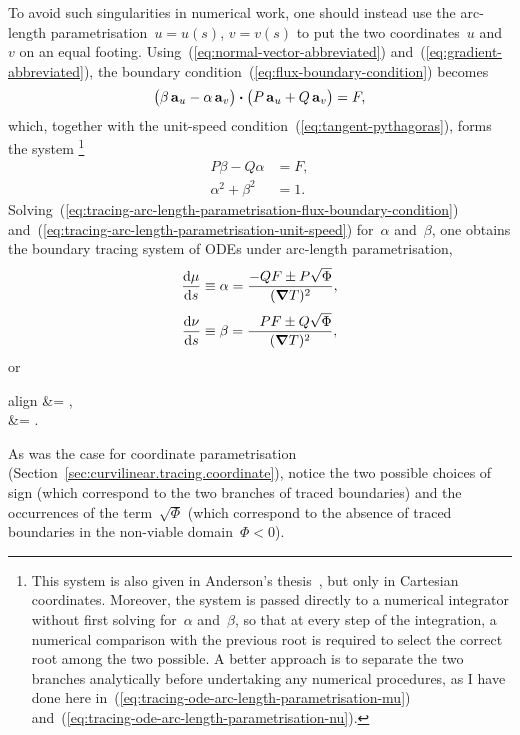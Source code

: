 To avoid such singularities in numerical work, one should instead use
the arc-length parametrisation~$u = u (s)$, $v = v(s)$
to put the two coordinates~$u$ and~$v$ on an equal footing.
Using~(\ref{eq:normal-vector-abbreviated})
and~(\ref{eq:gradient-abbreviated}),
the boundary condition~(\ref{eq:flux-boundary-condition}) becomes
\[
  \roundbr[\big]{\beta \basisvec{u} - \alpha \basisvec{v}}
    \dotp
  \roundbr[\big]{P \basisvec{u} + Q \basisvec{v}}
    =
  F,
\]
which, together with the unit-speed condition~(\ref{eq:tangent-pythagoras}),
forms the system%
\footnote{
  This system is also given
  in Anderson's thesis~\cite{anderson-2002-thesis-boundary-tracing-pdes},
  but only in Cartesian coordinates.
  Moreover, the system is passed directly to a numerical integrator
  without first solving for~$\alpha$ and~$\beta$,
  so that at every step of the integration,
  a numerical comparison with the previous root
  is required to select the correct root among the two possible.
  A better approach is to separate the two branches analytically
  before undertaking any numerical procedures,
  as I have done here
  in~(\ref{eq:tracing-ode-arc-length-parametrisation-mu})
  and~(\ref{eq:tracing-ode-arc-length-parametrisation-nu}).
}
\begin{align}
  P \beta - Q \alpha &= F,
    \label{eq:tracing-arc-length-parametrisation-flux-boundary-condition} \\
  \alpha^2 + \beta^2 &= 1.
    \label{eq:tracing-arc-length-parametrisation-unit-speed}
\end{align}
Solving~(\ref{eq:tracing-arc-length-parametrisation-flux-boundary-condition})
and~(\ref{eq:tracing-arc-length-parametrisation-unit-speed})
for~$\alpha$ and~$\beta$, one obtains
the boundary tracing system of ODEs under arc-length parametrisation,
\begin{align}
  \tder{\mu}{s} &\ideq \alpha = \frac{-Q F \pm P \sqrt{\Phi}}{(\del T)^2},
    \label{eq:tracing-ode-arc-length-parametrisation-mu} \\[\tallspace]
  \tder{\nu}{s} &\ideq \beta = \frac{\+P F \pm Q \sqrt{\Phi}}{(\del T)^2},
    \label{eq:tracing-ode-arc-length-parametrisation-nu}
\end{align}
or
\begin{important}{align}
   &= ,
    \label{eq:tracing-ode-arc-length-parametrisation-u} \\[\tallspace]
   &= .
    \label{eq:tracing-ode-arc-length-parametrisation-v}
\end{important}
As was the case for coordinate parametrisation
(Section~\ref{sec:curvilinear.tracing.coordinate}),
notice the two possible choices of sign
(which correspond to the two branches of traced boundaries)
and the occurrences of the term~$\sqrt{\Phi}$
(which correspond to the absence of traced boundaries
in the non-viable domain~$\Phi < 0$).

